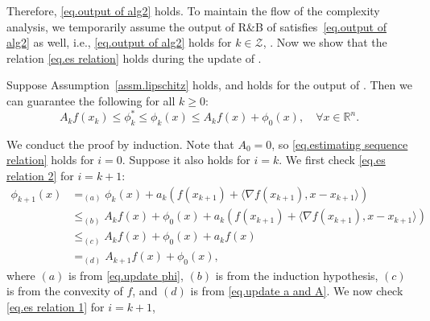 \documentclass[moor,sglanonrev]{informs4}
\begin{document}
Therefore, \eqref{eq.output of alg2} holds.
\Halmos \endproof
To maintain the flow of the complexity analysis, we temporarily assume the output of R\&B of  satisfies~\eqref{eq.output of alg2} as well, i.e., \eqref{eq.output of alg2} holds for $k\in\mathcal{Z}$, . Now we show that the relation \eqref{eq.es relation} holds during the update of .
\begin{lemma}\label{lem.estimate sequence}
    Suppose Assumption~\ref{assm.lipschitz} holds, and  holds for the output of . Then we can guarantee the following for all $k\geq 0$:
    \begin{equation}
        \label{eq.estimating sequence relation}
        A_k f(x_k)\leq \phi_k^*  \leq \phi_k(x)\leq A_k f(x)+\phi_0(x), \quad \forall x\in \mathbb{R}^n.
    \end{equation}
\end{lemma}
We conduct the proof by induction. Note that $A_0 = 0$, so \eqref{eq.estimating sequence relation} holds for $i=0$. Suppose it also holds for $i=k$.
We first check \eqref{eq.es relation 2} for $i=k+1$:
{\color{red}
\begin{align*}
    \phi_{k+1}(x) & =_{(a)}\phi_k(x)+a_k\left(f(x_{k+1})+\langle \nabla f(x_{k+1}),x-x_{k+1}\rangle \right)               \\
                  & \leq_{(b)} A_k f(x)+\phi_0(x) +a_k\left(f(x_{k+1})+\langle \nabla f(x_{k+1}),x-x_{k+1}\rangle \right) \\
                  & \leq_{(c)} A_k f(x)+\phi_0(x) +a_k f(x)                                                               \\
                  & =_{(d)}A_{k+1} f(x)+\phi_0(x),
\end{align*}
}
{\color{red} where $(a)$ is from \eqref{eq.update phi}, $(b)$ is from the induction hypothesis, $(c)$ is from the convexity of $f$, and $(d)$ is from \eqref{eq.update a and A}.}
We now check \eqref{eq.es relation 1} for $i=k+1$,
\end{document}
